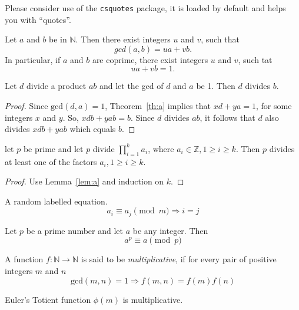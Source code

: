 Please consider use of the \texttt{csquotes} package, it is loaded by default and helps you with \enquote{quotes}.

\lipsum{}

\begin{theorem}\label{th:a}
Let $a$ and $b$ be in $\mathbb{N}$. Then there exist integers $u$ and $v$, such that
\[
gcd(a,b) = ua+vb.
\]
In particular, if $a$ and $b$ are coprime, there exist integers $u$ and $v$, such tat
\[
ua+vb=1.
\]
\end{theorem}

\begin{lemma}\label{lem:a}
Let $d$ divide a product $ab$ and let the gcd of $d$ and $a$ be 1. Then $d$ divides $b$.
\end{lemma}

\begin{proof}
Since $\mathrm{gcd}(d,a)=1$, Theorem~\ref{th:a} implies that $xd + ya = 1$, for some integers $x$ and $y$.
So, $xdb + yab = b$. Since $d$ divides $ab$, it follows that $d$ also divides $xdb + yab$ which equals $b$.
\end{proof}

\begin{corollary}
let $p$ be prime and let $p$ divide $\prod_{i=1}^{k}a_{i}$, where $a_{i}\in\mathbb{Z}, 1\geq i\geq k$. Then $p$ divides at least one of the factors $a_{i}, 1\geq i\geq k$.
\end{corollary}

\begin{proof}
Use Lemma~\ref{lem:a} and induction on $k$.
\end{proof}

\noindent
A random labelled equation.
\begin{equation}\label{eq:a}
a_{i}\equiv a_{j} \pmod{m}\Rightarrow i=j
\end{equation}

\begin{theorem}
Let $p$ be a prime number and let $a$ be any integer. Then
\[
a^{p}\equiv a\pmod{p}
\]
\end{theorem}

\begin{definition}
A function $f:\mathbb{N}\rightarrow\mathbb{N}$ is said to be \emph{multiplicative}, if for every pair of positive integers $m$ and $n$
\[
\mathrm{gcd}(m,n)=1\Rightarrow f(m,n)=f(m)f(n)
\]
\end{definition}

\begin{lemma}
Euler's Totient function $\phi(m)$ is multiplicative.
\end{lemma}

